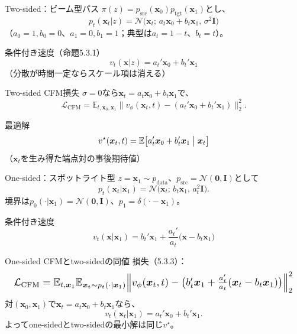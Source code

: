 \asmain
\begin{frame}{Two-sided：ビーム型パス}
    $\pi(z)=p_{\mathrm{src}}(\bm{x}_0)p_{\mathrm{tgt}}(\bm{x}_1)$とし、
    \[
        p_t(\bm{x}_t|z)
        =
        \mathcal{N}\!\bigl(
            \bm{x}_t;\,
            a_t\bm{x}_0+b_t\bm{x}_1,\,
            \sigma^{2}\bm{I}
        \bigr)
    \]
    （$a_0=1,b_0=0$、$a_1=0,b_1=1$；典型は$a_t=1-t$、$b_t=t$）。
    \begin{block}{条件付き速度（命題5.3.1）}
        \[
            v_t(\bm{x}|z)=a_t'\bm{x}_0+b_t'\bm{x}_1
        \]
        （分散が時間一定ならスケール項は消える）
    \end{block}
\end{frame}
\asmain
\begin{frame}{Two-sided CFM損失}
    $\sigma=0$なら$\bm{x}_t=a_t\bm{x}_0+b_t\bm{x}_1$で、
    \[
        \mathcal{L}_{\mathrm{CFM}}
        =
        \mathbb{E}_{t,\bm{x}_0,\bm{x}_1}
        \bigl\|
            v_\phi(\bm{x}_t,t)
            -
            (a_t'\bm{x}_0+b_t'\bm{x}_1)
        \bigr\|_{2}^{2}.
    \]
    \begin{block}{最適解}
        \[
            v^{\star}(\bm{x}_t,t)
            =
            \mathbb{E}\bigl[a_t'\bm{x}_0+b_t'\bm{x}_1\bigm|\bm{x}_t\bigr]
        \]
        （$\bm{x}_t$を生み得た端点対の事後期待値）
    \end{block}
\end{frame}
\asmain
\begin{frame}{One-sided：スポットライト型}
    $z=\bm{x}_1\sim p_{\mathrm{data}}$、$p_{\mathrm{src}}=\mathcal{N}(\bm{0},\bm{I})$として
    \[
        p_t(\bm{x}_t|\bm{x}_1)
        =
        \mathcal{N}\!\bigl(\bm{x}_t;\,b_t\bm{x}_1,\,a_t^{2}\bm{I}\bigr).
    \]
    境界は$p_0(\cdot|\bm{x}_1)=\mathcal{N}(\bm{0},\bm{I})$、$p_1=\delta(\cdot-\bm{x}_1)$。
    \begin{block}{条件付き速度}
        \[
            v_t(\bm{x}|\bm{x}_1)
            =
            b_t'\bm{x}_1
            +
            \dfrac{a_t'}{a_t}\bigl(\bm{x}-b_t\bm{x}_1\bigr)
        \]
    \end{block}
\end{frame}
\asmain
\begin{frame}{One-sided CFMとtwo-sidedの同値}
    損失（5.3.3）：
    \[
        \resizebox{0.98\textwidth}{!}{$
        \mathcal{L}_{\mathrm{CFM}}
        =
        \mathbb{E}_{t,\bm{x}_1}
        \mathbb{E}_{\bm{x}_t\sim p_t(\cdot|\bm{x}_1)}
        \Bigl\|
            v_\phi(\bm{x}_t,t)
            -
            \bigl(
                b_t'\bm{x}_1
                +
                \tfrac{a_t'}{a_t}(\bm{x}_t-b_t\bm{x}_1)
            \bigr)
        \Bigr\|_{2}^{2}
        $}
    \]
    対$(\bm{x}_0,\bm{x}_1)$で$\bm{x}_t=a_t\bm{x}_0+b_t\bm{x}_1$なら、
    \[
        v_t(\bm{x}_t|\bm{x}_1)=a_t'\bm{x}_0+b_t'\bm{x}_1.
    \]
    よってone-sidedとtwo-sidedの最小解は同じ$v^{\star}$。
\end{frame}
